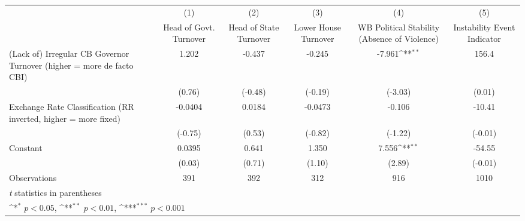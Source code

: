 {
\def\sym#1{\ifmmode^{#1}\else\(^{#1}\)\fi}
\begin{tabular}{l*{5}{c}}
\hline\hline
                &\multicolumn{1}{c}{(1)}&\multicolumn{1}{c}{(2)}&\multicolumn{1}{c}{(3)}&\multicolumn{1}{c}{(4)}&\multicolumn{1}{c}{(5)}\\
                &\multicolumn{1}{c}{Head of Govt. Turnover}&\multicolumn{1}{c}{Head of State Turnover}&\multicolumn{1}{c}{Lower House Turnover}&\multicolumn{1}{c}{WB Political Stability (Absence of Violence)}&\multicolumn{1}{c}{Instability Event Indicator}\\
\hline
(Lack of) Irregular CB Governor Turnover (higher = more de facto CBI)&    1.202         &   -0.437         &   -0.245         &   -7.961\sym{**} &    156.4         \\
                &   (0.76)         &  (-0.48)         &  (-0.19)         &  (-3.03)         &   (0.01)         \\
[1em]
Exchange Rate Classification (RR inverted, higher = more fixed)&  -0.0404         &   0.0184         &  -0.0473         &   -0.106         &   -10.41         \\
                &  (-0.75)         &   (0.53)         &  (-0.82)         &  (-1.22)         &  (-0.01)         \\
[1em]
Constant        &   0.0395         &    0.641         &    1.350         &    7.556\sym{**} &   -54.55         \\
                &   (0.03)         &   (0.71)         &   (1.10)         &   (2.89)         &  (-0.01)         \\
\hline
Observations    &      391         &      392         &      312         &      916         &     1010         \\
\hline\hline
\multicolumn{6}{l}{\footnotesize \textit{t} statistics in parentheses}\\
\multicolumn{6}{l}{\footnotesize \sym{*} \(p<0.05\), \sym{**} \(p<0.01\), \sym{***} \(p<0.001\)}\\
\end{tabular}
}
